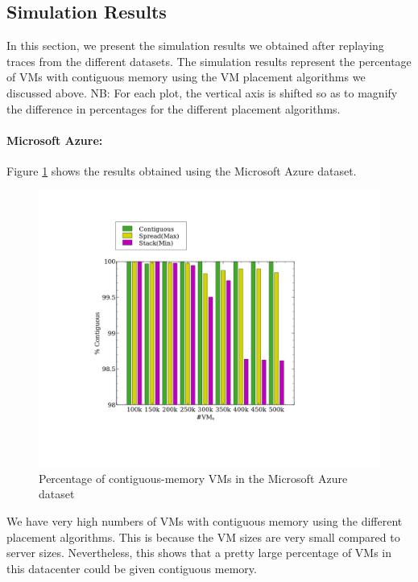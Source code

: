 \documentclass[sigconf]{sigplanconf}
\begin{document}
  
  \subsection{Simulation Results}
  In this section, we present the simulation results we obtained after replaying traces from the different datasets. The simulation results represent the percentage of VMs with contiguous memory using the VM placement algorithms we discussed above. NB: For each plot, the vertical axis is shifted so as to magnify the difference in percentages for the different placement algorithms.
  \paragraph{Microsoft Azure:} Figure \ref{fig:azure_res} shows the results obtained using the Microsoft Azure dataset.
  \begin{figure}[!h]
  	\centering
  	\includegraphics[scale=0.4]{azure-final.png}
  	\caption{Percentage of contiguous-memory VMs in the Microsoft Azure dataset}
  	\label{fig:azure_res}
  \end{figure}
  We have very high numbers of VMs with contiguous memory using the different placement algorithms. This is because the VM sizes are very small compared to server sizes. Nevertheless, this shows that a pretty large percentage of VMs in this datacenter could be given contiguous memory. 
  
\end{document}
